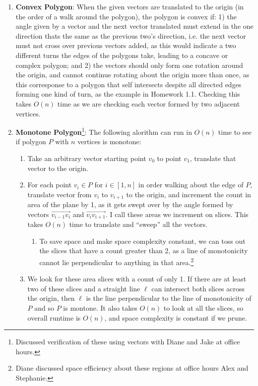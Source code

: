 \documentclass [12pt]{article}
\begin{document}
        \begin{enumerate}[label=\alph*.]
            \item \textbf{Convex Polygon}\footnotemark[2]: When the given vectors are translated to the origin (in the order of a walk around the polygon), the polygon is convex if: 1) the angle given by a vector and the next vector translated must extend in the one direction thats the same as the previous two's direction, i.e. the next vector must not cross over previous vectors added, as this would indicate a two different turns the edges of the polygons take, leading to a concave or complex polygon; and 2) the vectors should only form one rotation around the origin, and cannot continue rotating about the origin more than once, as this corresponse to a polygon that self intersects despite all directed edges forming one kind of turn, as the example in Homework 1.1. Checking this takes $O(n)$ time as we are checking each vector formed by two adjacent vertices.
            
            \item \textbf{Monotone Polygon}\footnote{Discussed verification of these using vectors with Diane and Jake at office hours.}: The following alorithm can run in $O(n)$ time to see if polygon $P$ with $n$ vertices is monotone: 
            
                \begin{enumerate}[label=\arabic*)]
                    \item Take an arbitrary vector starting point $v_0$ to point $v_{1}$, translate that vector to the origin.  
                    \item For each point $v_i \in P$ for $i \in [1,n]$ in order walking about the edge of $P$, translate vector from $v_{i}$ to $v_{i+1}$ to the origin, and increment the count in area of the plane by 1, as it gets swept over by the angle formed by vectors $\overrightarrow{v_{i-1} v_{i}}$ and $\overrightarrow{v_{i} v_{i+1}}$. I call these areas we increment on slices. This takes $O(n)$ time to translate and ``sweep'' all the vectors. 
                        \begin{enumerate}
                            \item To save space and make space complexity constant, we can toss out the slices that have a count greater than 2, as a line of monotonicity cannot lie perpendicular to anything in that area.\footnote{Diane discussed space efficiency about these regions at office hours Alex and Stephanie.} 
                        \end{enumerate}

                    \item We look for these area slices with a count of only 1. If there are at least two of these slices and a straight line $\ell$ can intersect both slices across the origin, then $\ell$ is the line perpendicular to the line of monotonicity of $P$ and so $P$ is montone. It also takes $O(n)$ to look at all the slices, so overall runtime is $O(n)$, and space complexity is constant if we prune. 
                \end{enumerate}

        \end{enumerate}
\end{document}
